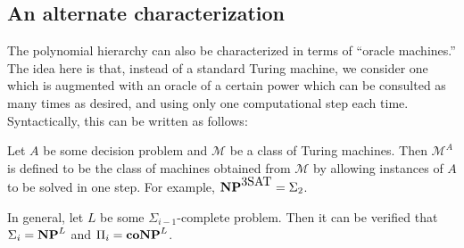 \subsection{An alternate characterization}

The polynomial hierarchy can also be characterized in terms of
``oracle machines.''  The idea here is that, instead of a standard
Turing machine, we consider one which is augmented with an oracle of a
certain power which can be consulted as many times as desired, and
using only one computational step each time.  Syntactically, this can
be written as follows:

Let $A$ be some decision problem and $\mathcal{M}$ be a class of Turing
machines.  Then $\mathcal{M}^A$ is defined to be the class of machines obtained
from $\mathcal{M}$ by allowing instances of $A$ to be solved in one step.
For example, $\np^{\tsat} = \Sigma_2$.

In general, let $L$ be some $\Sigma_{i-1}$-complete problem.  Then it can be verified
that $\Sigma_i = \np^L$ and $\Pi_i = \cnp^L$.




